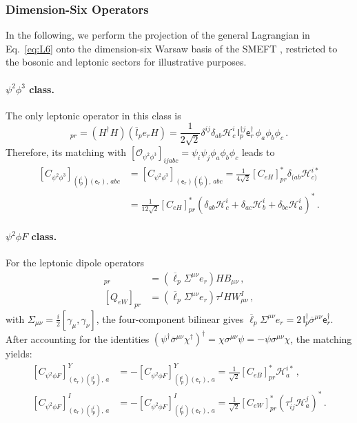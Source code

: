 \subsubsection{Dimension-Six Operators}

In the following, we perform the projection of the general Lagrangian in Eq.~\eqref{eq:L6} onto the dimension-six Warsaw basis of the SMEFT \cite{Grzadkowski:2010es}, restricted to the bosonic and leptonic sectors for illustrative purposes.

\paragraph{$\psi^2\phi^3$ class.}
The only leptonic operator in this class is
\begin{equation}
    [Q_{eH}]_{pr} = \left(H^\dagger H\right)\left(\overline l_p e_r H\right) = \frac{1}{2\sqrt{2}}\delta^{ij}\delta_{ab} \mathcal H_c^i \, \mathsf{l}^{\dagger j}_p \mathsf{e}^\dagger_r \, \phi_a \phi_b \phi_c \,.
\end{equation}
Therefore, its matching with $[\mathcal O_{\psi^2 \phi^3}]_{ijabc} = \psi_i \psi_j \phi_a\phi_b\phi_c$ leads to
\begin{align}
    \left[ C_{\psi^2\phi^3}\right]_{(\mathsf{l}^i_p)(\mathsf{e}_r),\,abc} &= \left[ C_{\psi^2\phi^3}\right]_{(\mathsf{e}_r)(\mathsf{l}^i_p),\,abc} = \frac{1}{4\sqrt{2}} [C_{eH}]_{pr}^* \delta_{(ab}\mathcal H^{i*}_{c)}
    \nonumber \\&= \frac{1}{12\sqrt{2}} [C_{eH}]_{pr}^* (\delta_{ab}\mathcal H^i_c + \delta_{ac}\mathcal H^i_b+ \delta_{bc}\mathcal H^i_a)^*
    \,.
\end{align}

\paragraph{$\psi^2\phi F$ class.}
For the leptonic dipole operators
\begin{align}
    [Q_{eB}]_{pr} &= \left(\overline\ell_p \Sigma^{\mu\nu} e_r\right)H B_{\mu\nu}\,,
    \\
    [Q_{eW}]_{pr} &= \left(\overline\ell_p \Sigma^{\mu\nu} e_r\right)\tau^I H W^I_{\mu\nu}\,,
\end{align}
with $\Sigma_{\mu\nu} = \frac{i}{2}[\gamma_\mu,\gamma_\nu]$, the four-component bilinear gives $\overline\ell_p\Sigma^{\mu\nu}e_r = 2\,\mathsf{l}_p^\dagger\overline\sigma^{\mu\nu}\mathsf{e}^\dagger_r$. After accounting for the identities $(\psi^\dagger \overline\sigma^{\mu\nu} \chi^\dagger)^\dagger = \chi \sigma^{\mu\nu} \psi = - \psi \sigma^{\mu\nu} \chi$, the matching yields:
\begin{align}
    \left[C_{\psi^2\phi F}\right]^Y_{(\mathsf e_r)(\mathsf l_p^i),\,a} &= - \left[C_{\psi^2\phi F}\right]^Y_{(\mathsf l_p^i)(\mathsf e_r),\,a} = \frac{1}{\sqrt{2}}[C_{eB}]_{pr}^* \mathcal H_a^{i*}\,,\label{eq:CeBproj}
    \\
    \left[C_{\psi^2\phi F}\right]^I_{(\mathsf e_r)(\mathsf l_p^i),\,a} &= - \left[C_{\psi^2\phi F}\right]^I_{(\mathsf l_p^i)(\mathsf e_r),\,a} = \frac{1}{\sqrt{2}}[C_{eW}]_{pr}^* (\tau^I_{ij} \mathcal H_a^j)^*\,.\label{eq:CeWproj}
\end{align}

